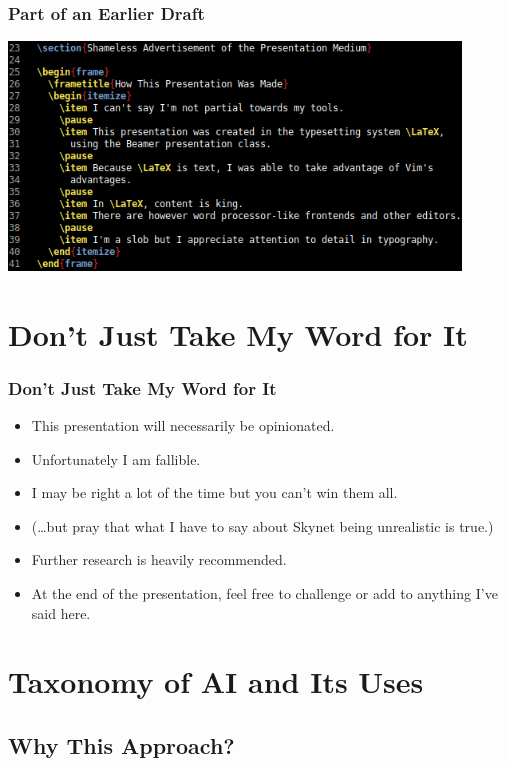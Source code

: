 \documentclass{beamer}
\begin{document}
  \begin{frame}
    \frametitle{Part of an Earlier Draft}
    \begin{center}
      \includegraphics[width=0.9\textwidth]{latex-section-and-frame.png}
    \end{center}
  \end{frame}

  \section{Don't Just Take My Word for It}

  \begin{frame}
    \frametitle{Don't Just Take My Word for It}

    \begin{itemize}
      \item This presentation will necessarily be opinionated.
      \pause
      \item Unfortunately I am fallible.
      \pause
      \item I may be right a lot of the time but you can't win them all.
      \pause
      \item (\ldots{}but pray that what I have to say about Skynet being
        unrealistic is true.)
      \pause
      \item Further research is heavily recommended.
      \pause
      \item At the end of the presentation, feel free to challenge or add to
        anything I've said here.
    \end{itemize}
  \end{frame}

  \section{Taxonomy of AI and Its Uses}

  \subsection{Why This Approach?}
\end{document}
